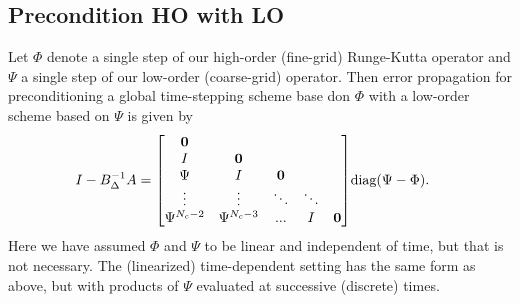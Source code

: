 \documentclass[a4paper,10pt]{article}
\begin{document}
\subsection{Precondition HO with LO}


Let $\Phi$ denote a single step of our high-order (fine-grid) Runge-Kutta operator and
$\Psi$ a single step of our low-order (coarse-grid) operator. Then error propagation for
preconditioning a global time-stepping scheme base don $\Phi$ with a low-order scheme 
based on $\Psi$ is given by 
%
\begin{align*}
I - B_\Delta^{-1} A & =
	{\begin{bmatrix} \mathbf{0} \\ I & \mathbf{0} \\ \Psi & I & \mathbf{0} \\ \vdots & \vdots & \ddots & \ddots \\ \Psi^{N_c-2} & \Psi^{N_c-3} & ... & I  & \mathbf{0} \end{bmatrix} } \textnormal{{diag}}{(\Psi - \Phi)}.
\end{align*}
%
Here we have assumed $\Phi$ and $\Psi$ to be linear and independent of time, but that
is not necessary. The (linearized) time-dependent setting has the same form as above,
but with products of $\Psi$ evaluated at successive (discrete) times.
\end{document}
